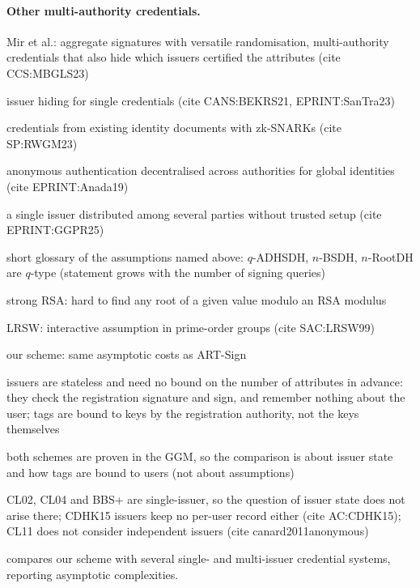 \paragraph{Other multi-authority credentials.}
\begin{outline}
  \item Mir et al.: aggregate signatures with versatile randomisation, multi-authority credentials that also hide which issuers certified the attributes (cite CCS:MBGLS23)
  \item issuer hiding for single credentials (cite CANS:BEKRS21, EPRINT:SanTra23)
  \item credentials from existing identity documents with zk-SNARKs (cite SP:RWGM23)
  \item anonymous authentication decentralised across authorities for global identities (cite EPRINT:Anada19)
  \item a single issuer distributed among several parties without trusted setup (cite EPRINT:GGPR25)
\end{outline}

\begin{outline}
  \item short glossary of the assumptions named above: $q$-ADHSDH, $n$-BSDH, $n$-RootDH are $q$-type (statement grows with the number of signing queries)
  \item strong RSA: hard to find any root of a given value modulo an RSA modulus
  \item LRSW: interactive assumption in prime-order groups (cite SAC:LRSW99)
\end{outline}

\begin{outline}
  \item our scheme: same asymptotic costs as ART-Sign
  \item issuers are stateless and need no bound on the number of attributes in advance: they check the registration signature and sign, and remember nothing about the user; tags are bound to keys by the registration authority, not the keys themselves
  \item both schemes are proven in the GGM, so the comparison is about issuer state and how tags are bound to users (not about assumptions)
  \item CL02, CL04 and BBS+ are single-issuer, so the question of issuer state does not arise there; CDHK15 issuers keep no per-user record either (cite AC:CDHK15); CL11 does not consider independent issuers (cite canard2011anonymous)
\end{outline}
 compares our scheme with several single- and
multi-issuer credential systems, reporting asymptotic complexities.


